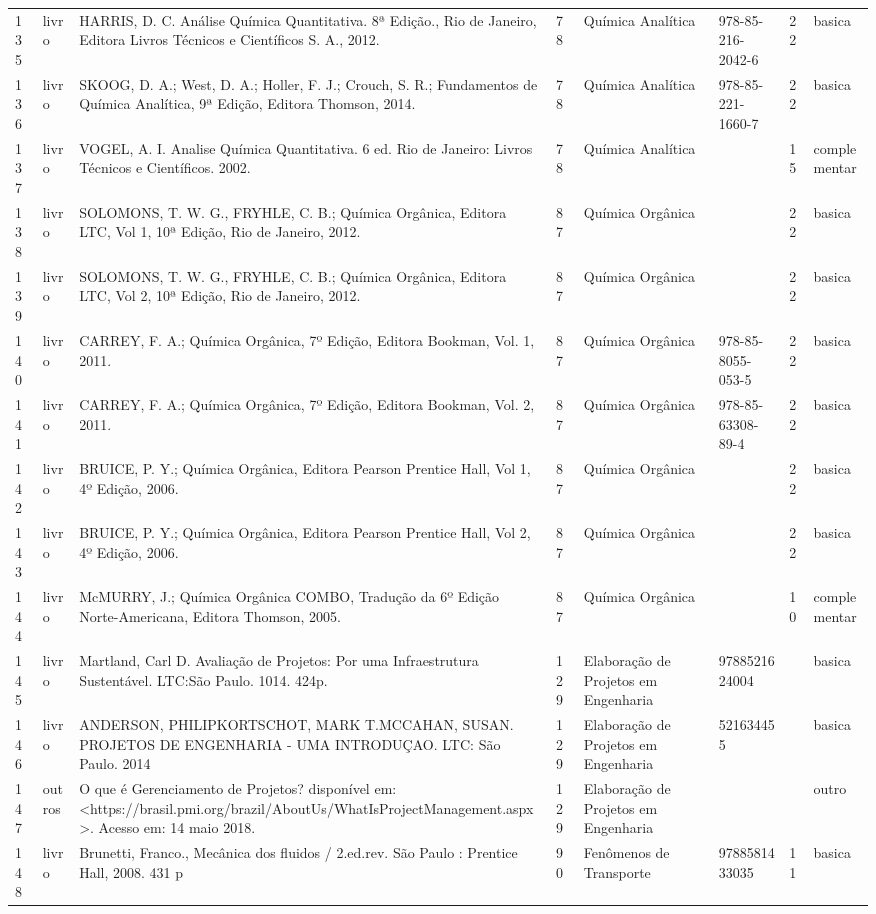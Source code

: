 \documentclass[12pt,a4paper,twoside]{report}
\begin{document}
\begin{longtable}{l|l|p{4cm}|l|p{3cm}|p{3cm}|l|l}
135&livro&HARRIS, D. C. Análise Química Quantitativa. 8ª Edição., Rio de Janeiro, Editora  Livros Técnicos e Científicos S. A., 2012.&78&Química Analítica&978-85-216-2042-6&22&basica\\
136&livro&SKOOG, D. A.; West, D. A.; Holler, F. J.; Crouch, S. R.; Fundamentos de Química Analítica, 9ª Edição, Editora Thomson, 2014.&78&Química Analítica&978-85-221-1660-7&22&basica\\
137&livro&VOGEL, A. I. Analise Química Quantitativa. 6 ed. Rio de Janeiro: Livros Técnicos e Científicos. 2002.&78&Química Analítica&&15&complementar\\
138&livro&SOLOMONS, T. W. G., FRYHLE, C. B.; Química Orgânica, Editora LTC, Vol 1, 10ª Edição, Rio de Janeiro, 2012.&87&Química Orgânica&&22&basica\\
139&livro&SOLOMONS, T. W. G., FRYHLE, C. B.; Química Orgânica, Editora LTC, Vol 2, 10ª Edição, Rio de Janeiro, 2012.&87&Química Orgânica&&22&basica\\
140&livro&CARREY, F. A.; Química Orgânica, 7º Edição, Editora Bookman, Vol. 1, 2011.&87&Química Orgânica&978-85-8055-053-5&22&basica\\
141&livro&CARREY, F. A.; Química Orgânica, 7º Edição, Editora Bookman, Vol. 2, 2011.&87&Química Orgânica&978-85-63308-89-4&22&basica\\
142&livro&BRUICE, P. Y.; Química Orgânica, Editora Pearson Prentice Hall, Vol 1, 4º Edição, 2006.&87&Química Orgânica&&22&basica\\
143&livro&BRUICE, P. Y.; Química Orgânica, Editora Pearson Prentice Hall, Vol 2, 4º Edição, 2006.&87&Química Orgânica&&22&basica\\
144&livro&McMURRY, J.; Química Orgânica COMBO, Tradução da 6º Edição Norte-Americana, Editora Thomson, 2005.&87&Química Orgânica&&10&complementar\\
145&livro&Martland, Carl D. Avaliação de Projetos: Por uma Infraestrutura Sustentável. LTC:São Paulo. 1014. 424p.&129&Elaboração de Projetos em Engenharia&9788521624004&&basica\\
146&livro&ANDERSON, PHILIPKORTSCHOT, MARK T.MCCAHAN, SUSAN. PROJETOS DE ENGENHARIA - UMA INTRODUÇAO. LTC: São Paulo. 2014&129&Elaboração de Projetos em Engenharia&521634455&&basica\\
147&outros&O que é Gerenciamento de Projetos? disponível em:<https://brasil.pmi.org/brazil/AboutUs/WhatIsProjectManagement.aspx>. Acesso em: 14 maio 2018.&129&Elaboração de Projetos em Engenharia&&&outro\\
148&livro&Brunetti, Franco., Mecânica dos fluidos / 2.ed.rev. São Paulo : Prentice Hall, 2008. 431 p&90&Fenômenos de Transporte&9788581433035&11&basica\\

\end{longtable}
\end{document}
